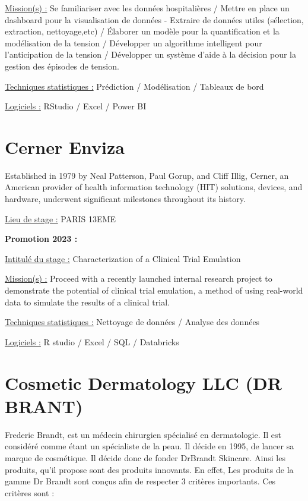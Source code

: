 \documentclass[
  letterpaper,
  DIV=11,
  numbers=noendperiod]{scrreprt}
\begin{document}
\uline{Mission(s) :} Se familiariser avec les données hospitalières /
Mettre en place un dashboard pour la visualisation de données - Extraire
de données utiles (sélection, extraction, nettoyage,etc) / Élaborer un
modèle pour la quantification et la modélisation de la tension /
Développer un algorithme intelligent pour l'anticipation de la tension /
Développer un système d'aide à la décision pour la gestion des épisodes
de tension.

\uline{Techniques statistiques :} Prédiction / Modélisation / Tableaux
de bord

\uline{Logiciels :} RStudio / Excel / Power BI

\hypertarget{cerner-enviza}{%
\section{\texorpdfstring{\textbf{Cerner
Enviza}}{Cerner Enviza}}\label{cerner-enviza}}

Established in 1979 by Neal Patterson, Paul Gorup, and Cliff Illig,
Cerner, an American provider of health information technology (HIT)
solutions, devices, and hardware, underwent significant milestones
throughout its history.

\uline{Lieu de stage :} PARIS 13EME

\textbf{Promotion 2023 :}

\uline{Intitulé du stage :} Characterization of a Clinical Trial
Emulation

\uline{Mission(s) :} Proceed with a recently launched internal research
project to demonstrate the potential of clinical trial emulation, a
method of using real-world data to simulate the results of a clinical
trial.

\uline{Techniques statistiques :} Nettoyage de données / Analyse des
données

\uline{Logiciels :} R studio / Excel / SQL / Databricks

\hypertarget{cosmetic-dermatology-llc-dr-brant}{%
\section{\texorpdfstring{\textbf{Cosmetic Dermatology LLC (DR
BRANT)}}{Cosmetic Dermatology LLC (DR BRANT)}}\label{cosmetic-dermatology-llc-dr-brant}}

Frederic Brandt, est un médecin chirurgien spécialisé en dermatologie.
Il est considéré comme étant un spécialiste de la peau. Il décide en
1995, de lancer sa marque de cosmétique. Il décide donc de fonder
DrBrandt Skincare. Ainsi les produits, qu'il propose sont des produits
innovants. En effet, Les produits de la gamme Dr Brandt sont conçus afin
de respecter 3 critères importants. Ces critères sont :
\end{document}
